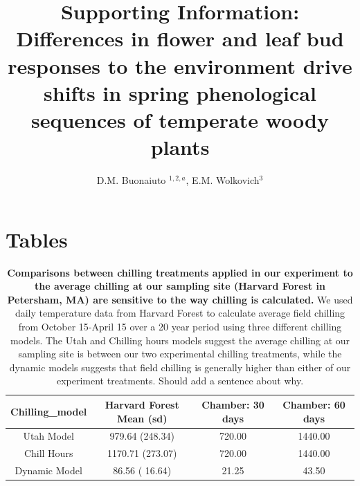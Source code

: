 \documentclass[11pt]{article}
\title{Supporting Information: Differences in flower and leaf bud responses to the environment drive shifts in spring phenological sequences of temperate woody plants}
\date{}
\author{D.M. Buonaiuto $^{1,2,a}$, E.M. Wolkovich$^{3}$}
\begin{document}
\maketitle

\section*{Tables}


\begin{table}[!ht]
\begin{tabular}{cccc}
  \hline
 Chilling\_model & Harvard Forest Mean (sd) & Chamber: 30 days & Chamber: 60 days \\ 
  \hline
 Utah Model & 979.64  (248.34) & 720.00 & 1440.00 \\ 
Chill Hours & 1170.71 (273.07) & 720.00 & 1440.00 \\ 
 Dynamic Model & 86.56 ( 16.64) & 21.25 & 43.50 \\ 
   \hline
\end{tabular}
\caption{\textbf{Comparisons between chilling treatments applied in our experiment to the average chilling at our sampling site (Harvard Forest in Petersham, MA)  are sensitive to the way chilling is calculated.} We used daily temperature data from Harvard Forest \citep{} to calculate average field chilling from October 15-April 15 over a 20 year period using three different chilling models. The Utah and Chilling hours models suggest the average chilling at our sampling site is between our two experimental chilling treatments, while the dynamic models suggests that field chilling is generally higher than either of our experiment treatments. Should add a sentence about why.}
\label{tab:chillcomps}
\end{table}
\end{document}
